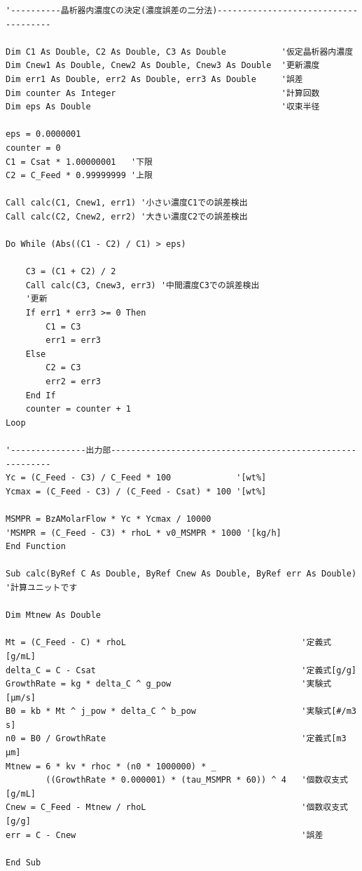 \documentclass[a4j]{jsreport}
\begin{document}
\begin{lstlisting}[caption=晶析器]
'----------晶析器内濃度Cの決定(濃度誤差の二分法)-------------------------------------

Dim C1 As Double, C2 As Double, C3 As Double           '仮定晶析器内濃度
Dim Cnew1 As Double, Cnew2 As Double, Cnew3 As Double  '更新濃度
Dim err1 As Double, err2 As Double, err3 As Double     '誤差
Dim counter As Integer                                 '計算回数
Dim eps As Double                                      '収束半径

eps = 0.0000001
counter = 0
C1 = Csat * 1.00000001   '下限
C2 = C_Feed * 0.99999999 '上限

Call calc(C1, Cnew1, err1) '小さい濃度C1での誤差検出
Call calc(C2, Cnew2, err2) '大きい濃度C2での誤差検出

Do While (Abs((C1 - C2) / C1) > eps)

    C3 = (C1 + C2) / 2
    Call calc(C3, Cnew3, err3) '中間濃度C3での誤差検出
    '更新
    If err1 * err3 >= 0 Then
        C1 = C3
        err1 = err3
    Else
        C2 = C3
        err2 = err3
    End If
    counter = counter + 1
Loop

'---------------出力部----------------------------------------------------------
Yc = (C_Feed - C3) / C_Feed * 100             '[wt%]
Ycmax = (C_Feed - C3) / (C_Feed - Csat) * 100 '[wt%]

MSMPR = BzAMolarFlow * Yc * Ycmax / 10000
'MSMPR = (C_Feed - C3) * rhoL * v0_MSMPR * 1000 '[kg/h]
End Function

Sub calc(ByRef C As Double, ByRef Cnew As Double, ByRef err As Double)
'計算ユニットです

Dim Mtnew As Double

Mt = (C_Feed - C) * rhoL                                   '定義式[g/mL]
delta_C = C - Csat                                         '定義式[g/g]
GrowthRate = kg * delta_C ^ g_pow                          '実験式[μm/s]
B0 = kb * Mt ^ j_pow * delta_C ^ b_pow                     '実験式[#/m3 s]
n0 = B0 / GrowthRate                                       '定義式[m3 μm]
Mtnew = 6 * kv * rhoc * (n0 * 1000000) * _
        ((GrowthRate * 0.000001) * (tau_MSMPR * 60)) ^ 4   '個数収支式[g/mL]
Cnew = C_Feed - Mtnew / rhoL                               '個数収支式[g/g]
err = C - Cnew                                             '誤差

End Sub
\end{lstlisting}
\end{document}
